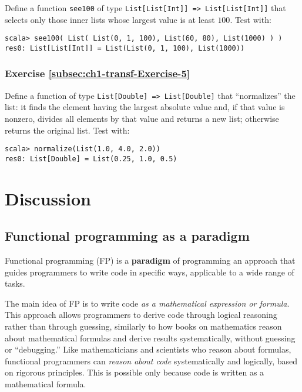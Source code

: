 Define a function \lstinline!see100! of type \texttt{}\lstinline!List[List[Int]] => List[List[Int]]!
that selects only those inner lists whose largest value is at least
$100$. Test with:
\begin{lstlisting}
scala> see100( List( List(0, 1, 100), List(60, 80), List(1000) ) )
res0: List[List[Int]] = List(List(0, 1, 100), List(1000))
\end{lstlisting}


\subsubsection{Exercise \label{subsec:ch1-transf-Exercise-5}\ref{subsec:ch1-transf-Exercise-5}}

Define a function of type \texttt{}\lstinline!List[Double] => List[Double]!
that \textsf{``}normalizes\textsf{''} the list: it finds the element having the largest
absolute value and, if that value is nonzero, divides all elements
by that value and returns a new list; otherwise returns the original
list. Test with:
\begin{lstlisting}
scala> normalize(List(1.0, 4.0, 2.0))
res0: List[Double] = List(0.25, 1.0, 0.5)
\end{lstlisting}


\section{Discussion}

\subsection{Functional programming as a paradigm}

Functional programming (FP) is a \textbf{paradigm}
of programming \textemdash{} an approach that guides programmers to
write code in specific ways, applicable to a wide range of tasks.

The main idea of FP is to write code \emph{as a mathematical expression
or formula}. This approach allows programmers to derive code through
logical reasoning rather than through guessing, similarly to how books
on mathematics reason about mathematical formulas and derive results
systematically, without guessing or \textsf{``}debugging.\textsf{''} Like mathematicians
and scientists who reason about formulas, functional programmers can
\emph{reason about code} systematically and logically, based on rigorous
principles. This is possible only because code is written as a mathematical
formula.

